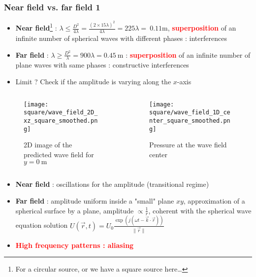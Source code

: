 \documentclass[UKenglish,8pt,aspectratio=1610]{beamer}
\begin{document}
	\begin{frame}
		\frametitle{Near field vs. far field 1}
		\begin{itemize}
			\item \textbf{Near field}\footnote{For a circular source, or we have a square source here\dots} : $\lambda \leq \frac{D^2}{4\lambda}=\frac{(2\times15\lambda)^2}{4\lambda}=225\lambda=~0.11\si{\meter}$, \textbf{\textcolor{red}{superposition}} of an infinite number of spherical waves with different phases : interferences
			\item \textbf{Far field} : $\lambda \geq \frac{D^2}{\lambda}=900\lambda=0.45~\si{\meter}$ : \textbf{\textcolor{red}{superposition}} of  an infinite number of plane waves with same phases : constructive interferences
			\item Limit ? Check if the amplitude is varying along the $x$-axis
		\end{itemize}
		\begin{columns}
		\begin{column}{0.5\textwidth}
			
			\vspace{-15pt}
			\begin{figure}[h!]
				\texttt{[image: square/wave\_field\_2D\_xz\_square\_smoothed.png]}
				\centering
					\vspace{-7pt}
				\caption{2D image of the predicted wave field for $y = 0~\si{\meter}$}
					\vspace{-8pt}
			\end{figure}
		\end{column}
		\begin{column}{0.5\textwidth}
			\vspace{-15pt}
			\begin{figure}[h!]
				\texttt{[image: square/wave\_field\_1D\_center\_square\_smoothed.png]}
				\centering
					\vspace{-7pt}
				\caption{Pressure at the wave field center}
					\vspace{-8pt}
			\end{figure}

		\end{column}
		\end{columns}
		\begin{itemize}
		\item \textbf{Near field} : oscillations for the amplitude (transitional regime)
		\item \textbf{Far field} : amplitude uniform inside a "small" plane $xy$, approximation of a spherical surface by a plane, amplitude $\propto \frac{1}{r}$, coherent with the spherical wave equation solution $U(\vec{r},t)=U_0\frac{\exp(j(\omega t-\vec{k}\cdot\vec{r}))}{\rVert\vec{r}\rVert}$
		\item \textbf{\textcolor{red}{High frequency patterns : aliasing}}
		
	\end{itemize}
	\end{frame}
\end{document}
